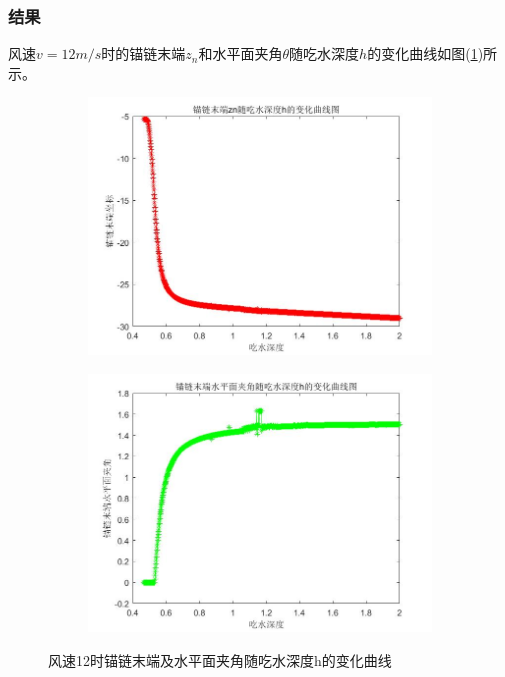         \subsubsection{结果}
            \par
            风速$v=12m/s$时的锚链末端$z_n$和水平面夹角$\theta$随吃水深度$h$的变化曲线如图(\ref{风速12时锚链末端及水平面夹角随吃水深度h的变化曲线})所示。
            \begin{figure}[H]
                \centering
                \begin{subfigure}[b]{0.4\textwidth}
                    \includegraphics[width=\textwidth]{images/3D_v_wind_12_zn_h.jpg}
                \end{subfigure}
                \begin{subfigure}[b]{0.4\textwidth}
                    \includegraphics[width=\textwidth]{images/3D_v_wind_12_theta_h.jpg}
                \end{subfigure}
                \caption{风速12时锚链末端及水平面夹角随吃水深度h的变化曲线}
                \label{风速12时锚链末端及水平面夹角随吃水深度h的变化曲线}
            \end{figure}
